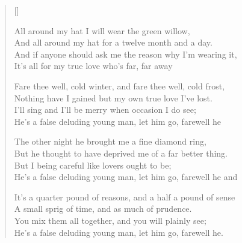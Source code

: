 \pagebreak
\settowidth{\versewidth}{And all around my hat for a twelve month and a day}
\begin{verse}[\versewidth]
\\
\begin{chorus}
All around my hat I will wear the green willow,\\
And all around my hat for a twelve month and a day.\\
And if anyone should ask me the reason why I'm wearing it,\\
It's all for my true love who's far, far away
\end{chorus}

Fare thee well, cold winter, and fare thee well, cold frost,\\
Nothing have I gained but my own true love I've lost.\\
I'll sing and I'll be merry when occasion I do see;\\
He's a false deluding young man, let him go, farewell he



The other night he brought me a fine diamond ring,\\
But he thought to have deprived me of a far better thing.\\
But I being careful like lovers ought to be;\\
He's a false deluding young man, let him go, farewell he and

It's a quarter pound of reasons, and a half a pound of sense\\
A small sprig of time, and as much of prudence.\\
You mix them all together, and you will plainly see;\\
He's a false deluding young man, let him go, farewell he.

\end{verse}
